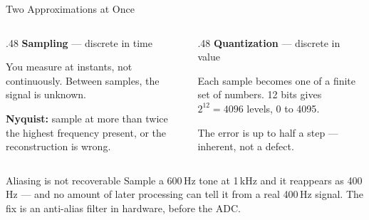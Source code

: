 \documentclass[9pt,aspectratio=169,xcolor=table]{beamer}
\begin{document}
\begin{frame}{Two Approximations at Once}
    \begin{columns}[T]
    \begin{column}{.48\textwidth}
        \textbf{Sampling} --- discrete in \alert{time}

        \vspace{1mm}
        {\small You measure at instants, not continuously. Between samples, the
        signal is unknown.}

        \vspace{2mm}
        {\small \textbf{Nyquist:} sample at more than \alert{twice} the highest
        frequency present, or the reconstruction is wrong.}
    \end{column}
    \begin{column}{.48\textwidth}
        \textbf{Quantization} --- discrete in \alert{value}

        \vspace{1mm}
        {\small Each sample becomes one of a finite set of numbers. 12 bits gives
        $2^{12} = 4096$ levels, \alert{0 to 4095}.}

        \vspace{2mm}
        {\small The error is up to half a step --- inherent, not a defect.}
    \end{column}
    \end{columns}

    \vspace{3mm}
    \begin{block}{Aliasing is not recoverable}
        Sample a 600\,Hz tone at 1\,kHz and it reappears as 400\,Hz --- and no
        amount of later processing can tell it from a real 400\,Hz signal. The
        fix is an \alert{anti-alias filter in hardware}, before the ADC.
    \end{block}
\end{frame}
\end{document}
